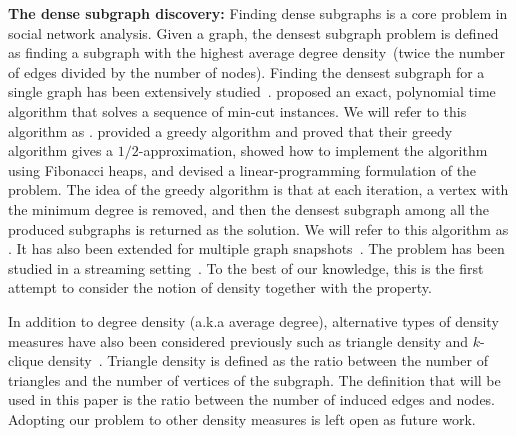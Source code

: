 \textbf{The dense subgraph discovery:}
Finding dense subgraphs is a core problem in social network analysis. 
Given a graph, the densest subgraph problem is defined as finding a subgraph with the highest average degree density~(twice the number of edges divided by the number of nodes).
Finding the densest subgraph for a single graph has been extensively studied~\cite{goldberg1984finding,charikar2000greedy,khuller2009finding}.
\citet{goldberg1984finding} proposed an exact,
polynomial time algorithm that solves a sequence of min-cut instances. We will refer to this algorithm as \algdg. \citet{asahiro2000greedily} provided a greedy algorithm and 
 \citet{charikar2000greedy} proved that their greedy algorithm gives a $1/2$-approximation, showed how to implement the algorithm using Fibonacci heaps, and devised a linear-programming formulation of the problem. The idea of the greedy algorithm is that at each iteration, a vertex with the minimum degree is removed, and then the densest
subgraph among all the produced subgraphs is returned as the solution. We will refer to this algorithm as \algdc. It has also been extended for multiple graph snapshots~\cite{jethava2015finding,semertzidis2019finding,arachchi2023jaccard}. The problem has been studied in a streaming setting~\cite{bhattacharya2015space}. 
To the best of our knowledge, this is the first attempt to consider the notion of density together with the \stc property.

In addition to degree density (a.k.a average degree), alternative types of density measures have also been considered previously such as triangle density and $k$-clique density~\cite{tsourakakis2015k}.
Triangle density is defined as the ratio between the number of triangles and the number of vertices of the subgraph.
The definition that will be used in this paper is the ratio between the number of induced edges and nodes.
Adopting our problem to other density measures is left open as future work.